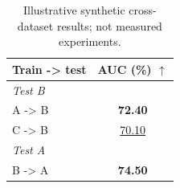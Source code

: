 \begin{table}[t]
\centering
\caption{Illustrative synthetic cross-dataset results; not measured experiments.}
\label{tab:cross-dataset}
\begin{tabular}{@{}lc@{}}
\toprule
Train -\textgreater{} test & AUC (\%) $\uparrow$ \\
\midrule
\multicolumn{2}{l}{\textit{Test B}} \\
A -\textgreater{} B & \textbf{72.40} \\
C -\textgreater{} B & \underline{70.10} \\
\midrule
\multicolumn{2}{l}{\textit{Test A}} \\
B -\textgreater{} A & \textbf{74.50} \\
\bottomrule
\end{tabular}
\end{table}
